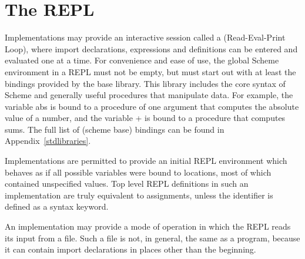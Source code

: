 \section{The REPL}

Implementations may provide an interactive session called a
 (Read-Eval-Print Loop), where import declarations,
expressions and definitions can be
entered and evaluated one at a time.  For convenience and ease of use,
the global Scheme environment in a REPL
must not be empty, but must start out with at least the bindings provided by the
base library.  This library includes the core syntax of Scheme
and generally useful procedures that manipulate data.  For example, the
variable {\cf abs} is bound to a
procedure of one argument that computes the absolute value of a
number, and the variable {\cf +} is bound to a procedure that computes
sums.  The full list of {\cf(scheme base)} bindings can be found in
Appendix~\ref{stdlibraries}.

Implementations are permitted to provide an initial REPL environment 
which behaves as if all possible variables were bound to locations, most of
which contained unspecified values.  Top level REPL definitions in
such an implementation are truly equivalent to assignments,
unless the identifier is defined as a syntax keyword.

An implementation may provide a mode of operation in which the REPL
reads its input from a file.  Such a file is not, in general, the same
as a program, because it can contain import declarations in places other than
the beginning.

